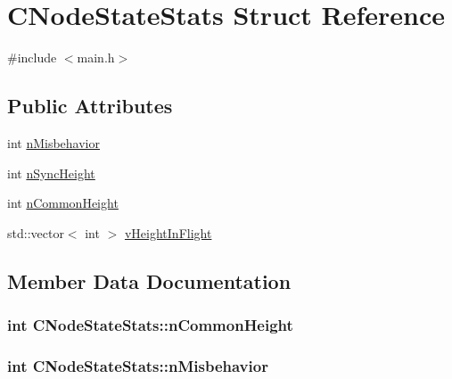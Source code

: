 \hypertarget{struct_c_node_state_stats}{}\section{C\+Node\+State\+Stats Struct Reference}
\label{struct_c_node_state_stats}


{\ttfamily \#include $<$main.\+h$>$}

\subsection*{Public Attributes}
\begin{DoxyCompactItemize}
\item 
int \hyperlink{struct_c_node_state_stats_a62c2243d09166c1daaad84519700da3c}{n\+Misbehavior}
\item 
int \hyperlink{struct_c_node_state_stats_a7646deac801098e973a5bc50202f92cd}{n\+Sync\+Height}
\item 
int \hyperlink{struct_c_node_state_stats_a67c910a57285a63bbf0bb88ea7a9ca05}{n\+Common\+Height}
\item 
std\+::vector$<$ int $>$ \hyperlink{struct_c_node_state_stats_a4b03fd8ecaa9268f7eca836e5e79c35a}{v\+Height\+In\+Flight}
\end{DoxyCompactItemize}


\subsection{Member Data Documentation}
\hypertarget{struct_c_node_state_stats_a67c910a57285a63bbf0bb88ea7a9ca05}{}
\subsubsection[{n\+Common\+Height}]{\setlength{\rightskip}{0pt plus 5cm}int C\+Node\+State\+Stats\+::n\+Common\+Height}\label{struct_c_node_state_stats_a67c910a57285a63bbf0bb88ea7a9ca05}
\hypertarget{struct_c_node_state_stats_a62c2243d09166c1daaad84519700da3c}{}
\subsubsection[{n\+Misbehavior}]{\setlength{\rightskip}{0pt plus 5cm}int C\+Node\+State\+Stats\+::n\+Misbehavior}\label{struct_c_node_state_stats_a62c2243d09166c1daaad84519700da3c}
\hypertarget{struct_c_node_state_stats_a7646deac801098e973a5bc50202f92cd}{}
